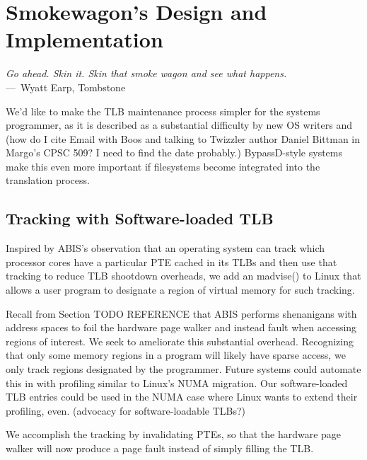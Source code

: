 
\chapter{Smokewagon's Design and Implementation}
\label{ch:Implementation}

\begin{epigraph}
	\emph{Go ahead. Skin it. Skin that smoke wagon and see what happens.} \\
	---~Wyatt Earp, Tombstone
\end{epigraph}

We'd like to make the TLB maintenance process simpler for the systems programmer, as it is described as a substantial difficulty by new OS writers \cite{boos_theseus_2022} and (how do I cite Email with Boos and talking to Twizzler author Daniel Bittman in Margo's CPSC 509? I need to find the date probably.) BypassD-style systems \cite{yadalam_bypassd_2024} make this even more important if filesystems become integrated into the translation process.

\section{Tracking with Software-loaded TLB}

Inspired by ABIS's observation that an operating system can track which processor cores have a particular \ac{PTE} cached in its \ac{TLB}s and then use that tracking to reduce TLB shootdown overheads\cite{amit_optimizing_2017}, we add an madvise() to Linux that allows a user program to designate a region of virtual memory for such tracking.

Recall from Section TODO REFERENCE that ABIS performs shenanigans with address spaces to foil the hardware page walker and instead fault when accessing regions of interest. We seek to ameliorate this substantial overhead. Recognizing that only some memory regions in a program will likely have sparse access, we only track regions designated by the programmer. Future systems could automate this in with profiling similar to Linux's NUMA migration. Our software-loaded TLB entries could be used in the NUMA case where Linux wants to extend their profiling, even. (advocacy for software-loadable TLBs?)

We accomplish the tracking by invalidating \ac{PTE}s, so that the hardware page walker will now produce a page fault instead of simply filling the \ac{TLB}.

